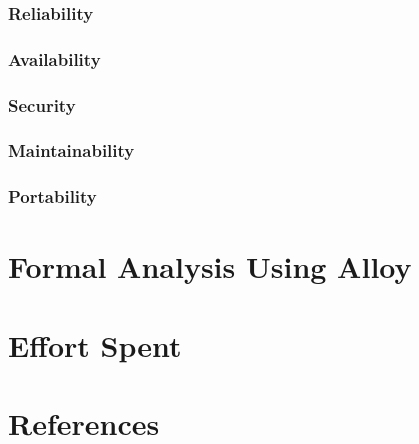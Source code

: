 \documentclass[12pt]{article}
\begin{document}
\subsubsection{Reliability}

\subsubsection{Availability}

\subsubsection{Security}

\subsubsection{Maintainability}

\subsubsection{Portability}

\section{Formal Analysis Using Alloy}

\section{Effort Spent}

\section{References}
\end{document}
